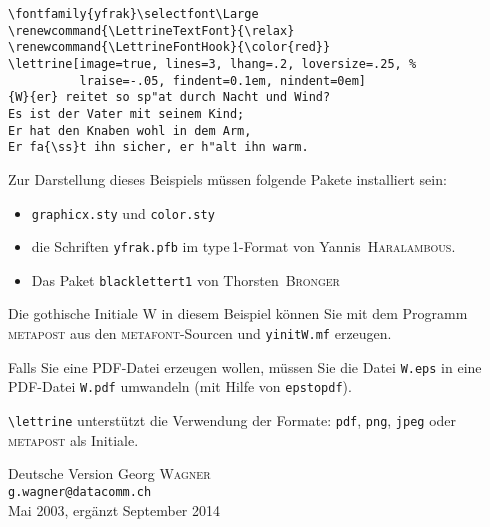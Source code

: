 \documentclass[12pt,a4paper]{article}
\newcommand{\MF}{{\small\sffamily\scshape metafont}}
\newcommand{\MP}{{\small\sffamily\scshape metapost}}
\begin{document}
\begin{verbatim}
\fontfamily{yfrak}\selectfont\Large
\renewcommand{\LettrineTextFont}{\relax}
\renewcommand{\LettrineFontHook}{\color{red}}
\lettrine[image=true, lines=3, lhang=.2, loversize=.25, %
          lraise=-.05, findent=0.1em, nindent=0em]
{W}{er} reitet so sp"at durch Nacht und Wind?
Es ist der Vater mit seinem Kind;
Er hat den Knaben wohl in dem Arm,
Er fa{\ss}t ihn sicher, er h"alt ihn warm.
\end{verbatim}

Zur Darstellung dieses Beispiels m\"ussen folgende Pakete installiert sein:
\begin{itemize}
\item \verb+graphicx.sty+ und \verb+color.sty+
\item die Schriften \verb+yfrak.pfb+ im type\,1-Format
   von Yannis~\textsc{Haralambous}.
\item Das Paket \verb+blacklettert1+ von Thorsten~\textsc{Bronger}
\end{itemize}

Die gothische Initiale \glqq W\grqq{} in diesem Beispiel k\"onnen Sie mit dem
Programm \MP{} aus den \MF{}-Sourcen und \verb+yinitW.mf+ erzeugen.

Falls Sie eine PDF-Datei erzeugen wollen, m\"ussen Sie die Datei \verb+W.eps+
in eine PDF-Datei \verb+W.pdf+ umwandeln (mit Hilfe von \verb+epstopdf+).

\verb+\lettrine+ unterst\"utzt die Verwendung der Formate:
\texttt{pdf}, \texttt{png}, \texttt{jpeg} oder \MP{} als Initiale.

\vfill
\begin{flushright}
  Deutsche Version Georg \textsc{Wagner}\\
  \texttt{g.wagner@datacomm.ch}\\
  Mai 2003, erg\"anzt September 2014
\end{flushright}
\end{document}
